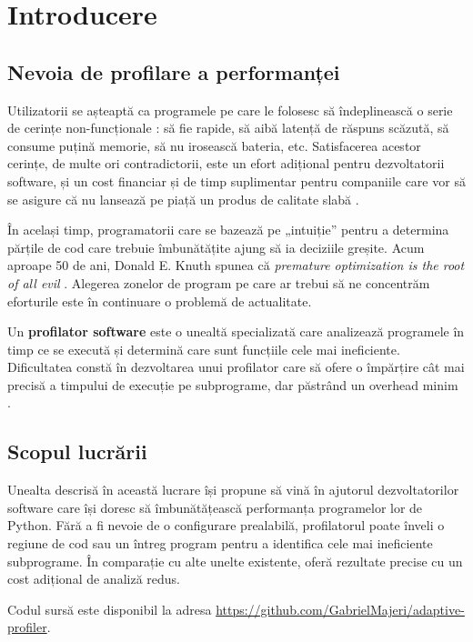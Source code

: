\chapter{Introducere}

\section{Nevoia de profilare a performanței}

Utilizatorii se așteaptă ca programele pe care le folosesc să îndeplinească o serie de cerințe non-funcționale \cite{software_requirements_book}: să fie rapide, să aibă latență de răspuns scăzută, să consume puțină memorie, să nu irosească bateria, etc. Satisfacerea acestor cerințe, de multe ori contradictorii, este un efort adițional pentru dezvoltatorii software, și un cost financiar și de timp suplimentar pentru companiile care vor să se asigure că nu lansează pe piață un produs de calitate slabă \cite{the_standish_report}.

În același timp, programatorii care se bazează pe „intuiție” pentru a determina părțile de cod care trebuie îmbunătățite ajung să ia deciziile greșite. Acum aproape 50 de ani, Donald E. Knuth spunea că \textit{premature optimization is the root of all evil} \cite{premature_optimization}. Alegerea zonelor de program pe care ar trebui să ne concentrăm eforturile este în continuare o problemă de actualitate.

Un \textbf{profilator software} este o unealtă specializată care analizează programele în timp ce se execută și determină care sunt funcțiile cele mai ineficiente. Dificultatea constă în dezvoltarea unui profilator care să ofere o împărțire cât mai precisă a timpului de execuție pe subprograme, dar păstrând un overhead minim \cite{profiler_inaccuracies}.

\section{Scopul lucrării}

Unealta descrisă în această lucrare își propune să vină în ajutorul dezvoltatorilor software care își doresc să îmbunătățească performanța programelor lor de Python. Fără a fi nevoie de o configurare prealabilă, profilatorul poate înveli o regiune de cod sau un întreg program pentru a identifica cele mai ineficiente subprograme. În comparație cu alte unelte existente, oferă rezultate precise cu un cost adițional de analiză redus.

Codul sursă este disponibil la adresa \href{https://github.com/GabrielMajeri/adaptive-profiler}{https://github.com/GabrielMajeri/adaptive-profiler}.

